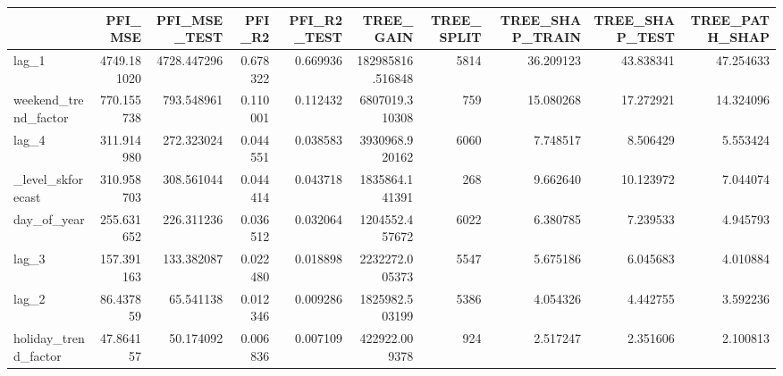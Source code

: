 \begin{tabular}{lrrrrrrrrr}
\toprule
 & PFI_MSE & PFI_MSE_TEST & PFI_R2 & PFI_R2_TEST & TREE_GAIN & TREE_SPLIT & TREE_SHAP_TRAIN & TREE_SHAP_TEST & TREE_PATH_SHAP \\
\midrule
lag_1 & 4749.181020 & 4728.447296 & 0.678322 & 0.669936 & 182985816.516848 & 5814 & 36.209123 & 43.838341 & 47.254633 \\
weekend_trend_factor & 770.155738 & 793.548961 & 0.110001 & 0.112432 & 6807019.310308 & 759 & 15.080268 & 17.272921 & 14.324096 \\
lag_4 & 311.914980 & 272.323024 & 0.044551 & 0.038583 & 3930968.920162 & 6060 & 7.748517 & 8.506429 & 5.553424 \\
_level_skforecast & 310.958703 & 308.561044 & 0.044414 & 0.043718 & 1835864.141391 & 268 & 9.662640 & 10.123972 & 7.044074 \\
day_of_year & 255.631652 & 226.311236 & 0.036512 & 0.032064 & 1204552.457672 & 6022 & 6.380785 & 7.239533 & 4.945793 \\
lag_3 & 157.391163 & 133.382087 & 0.022480 & 0.018898 & 2232272.005373 & 5547 & 5.675186 & 6.045683 & 4.010884 \\
lag_2 & 86.437859 & 65.541138 & 0.012346 & 0.009286 & 1825982.503199 & 5386 & 4.054326 & 4.442755 & 3.592236 \\
holiday_trend_factor & 47.864157 & 50.174092 & 0.006836 & 0.007109 & 422922.009378 & 924 & 2.517247 & 2.351606 & 2.100813 \\
\bottomrule
\end{tabular}

